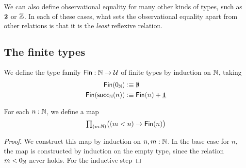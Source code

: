 We can also define observational equality for many other kinds of types, such as $\mathbf{2}$ or ${\mathbb{Z}}$. In each of these cases, what sets the observational equality apart from other relations is that it is the \emph{least} reflexive relation. 

\subsection{The finite types}

\begin{defn}\label{defn:fin}
We define the type family $\mathsf{Fin}:{\mathbb{N}}\to\mathcal{U}$ of finite types by induction on ${\mathbb{N}}$, taking
\begin{align*}
\mathsf{Fin}(0_{{\mathbb{N}}}) & \vcentcolon\equiv \emptyset \\
\mathsf{Fin}(\mathsf{succ}_{{\mathbb{N}}}(n)) & \vcentcolon\equiv \mathsf{Fin}(n)+\underline{\mathbf{1}}
\end{align*}
\end{defn}

\begin{defn}
  For each $n:{\mathbb{N}}$, we define a map
  \begin{equation*}
    \prd{m:\N} \big((m<n)\to \mathsf{Fin}(n)\big)
  \end{equation*}
\end{defn}

\begin{proof}
  We construct this map by induction on $n,m:{\mathbb{N}}$. In the base case for $n$, the map is constructed by induction on the empty type, since the relation $m<0_{{\mathbb{N}}}$ never holds. For the inductive step
\end{proof}

